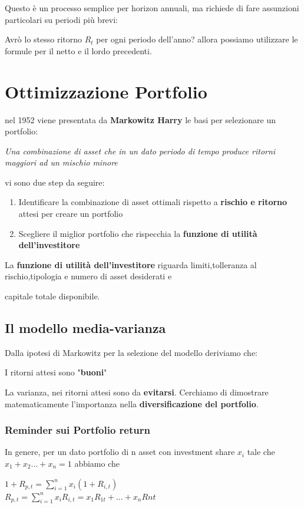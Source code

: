 \documentclass[a4paper,11pt]{report}
\begin{document}
{ 	Questo è un processo semplice per horizon annuali, ma richiede di fare assunzioni particolari su periodi più brevi:

	Avrò lo stesso ritorno $R_t$ per ogni periodo dell'anno? allora possiamo utilizzare le formule per il netto e il lordo precedenti.
 \newpage
  
\chapter{Ottimizzazione Portfolio}
	nel 1952 viene presentata da \textbf{Markowitz Harry} le basi per selezionare un portfolio:

\begin{center}
	{\emph{Una combinazione di asset che in un dato periodo di tempo produce ritorni maggiori ad un mischio minore}}
\end{center}

	vi sono due step da seguire:
\begin{enumerate}
	\item Identificare la combinazione di asset ottimali rispetto a \textbf{rischio e ritorno} attesi per creare un portfolio
	\item Scegliere il miglior portfolio che rispecchia la \textbf{funzione di utilità dell'investitore}
\end{enumerate}
	La \textbf{funzione di utilità dell'investitore} riguarda limiti,tolleranza al rischio,tipologia e numero di asset desiderati e

	capitale totale disponibile.
\newpage

\section{Il modello media-varianza}
	Dalla ipotesi di Markowitz per la selezione del modello deriviamo che:

	I ritorni attesi sono "\textbf{buoni}"

	La varianza, nei ritorni attesi sono da \textbf{evitarsi}. \newline
	Cerchiamo di dimostrare matematicamente l'importanza nella \textbf{diversificazione del portfolio}. 
\subsection{Reminder sui Portfolio return}
	In genere, per un dato portfolio di n asset con investment share $x_i$ tale che $x_1+x_2...+x_n = 1$ abbiamo che
\begin{center}
	$1+R_{p,t} = \sum\limits_{i=1}^n x_i(1+R_{i,t}) $\\
	$R_{p,t} =  \sum\limits_{i=1}^n x_i R_{i,t}= x_1 R_{1t}+... + x_n R{nt}$
\end{center}

}
\end{document}
